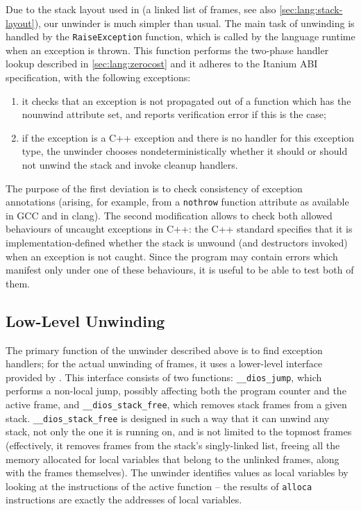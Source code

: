 Due to the stack layout used in \divm{} (a linked list of frames, see also
\autoref{sec:lang:stack-layout}), our unwinder is much simpler than
usual. The main task of unwinding is handled by the
\texttt{RaiseException} function, which is called by the language
runtime when an exception is thrown. This function performs the two-phase
handler lookup described in \autoref{sec:lang:zerocost} and it
adheres to the Itanium ABI specification, with the following exceptions:

\begin{enumerate}
\def\labelenumi{\roman{enumi}.}
\item
  it checks that an exception is not propagated out of a function which
  has the nounwind attribute set, and reports verification error if this
  is the case;
\item
  if the exception is a C++ exception and there is no handler for this
  exception type, the unwinder chooses nondeterministically whether it
  should or should not unwind the stack and invoke cleanup handlers.
\end{enumerate}

The purpose of the first deviation is to check consistency of exception
annotations (arising, for example, from a \texttt{nothrow} function
attribute as available in GCC and in clang). The second modification
allows \divine{} to check both allowed behaviours of uncaught exceptions in
C++: the C++ standard specifies that it is implementation-defined
whether the stack is unwound (and destructors invoked) when an exception
is not caught.
Since the program may contain
errors which manifest only under one of these behaviours, it is useful
to be able to test both of them.

\subsection{Low-Level Unwinding}\label{sec:unwinder:ll}

The primary function of the unwinder described above is to find
exception handlers; for the actual unwinding of frames, it uses a
lower-level interface provided by \dios{}. This interface consists of two
functions: \texttt{\_\_dios\_jump}, which performs a non-local jump,
possibly affecting both the program counter and the active frame, and
\texttt{\_\_dios\_stack\_free}, which removes stack frames from a given
stack. \texttt{\_\_dios\_stack\_free} is designed in such a way that it can
unwind any stack, not only the one it is running on, and is not limited
to the topmost frames (effectively, it removes frames from the stack's
singly-linked list, freeing all the memory allocated for local variables
that belong to the unlinked frames, along with the frames
themselves). The unwinder
identifies values as local variables by looking at the instructions of
the active function -- the results of \texttt{alloca} instructions are
exactly the addresses of local variables.

